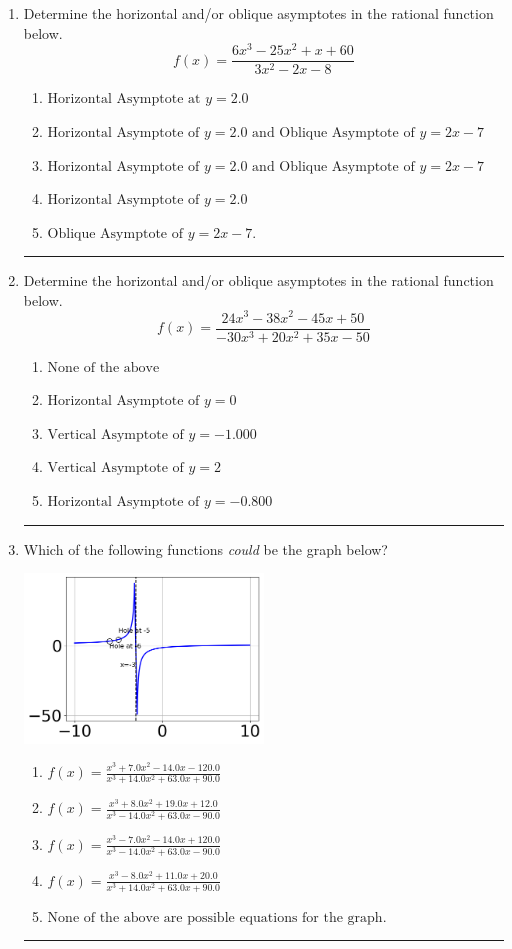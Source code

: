 \documentclass[14pt]{extbook}
\newcommand{\litem}[1]{\item#1\hspace*{-1cm}\rule{\textwidth}{0.4pt}}
\begin{document}
\begin{enumerate}
{\begin{enumerate}[label=\Alph*.]
\end{enumerate} }
\litem{
Determine the horizontal and/or oblique asymptotes in the rational function below.\[ f(x) = \frac{6x^{3} -25 x^{2} +x + 60}{3x^{2} -2 x -8} \]\begin{enumerate}[label=\Alph*.]
\item \( \text{Horizontal Asymptote at } y = 2.0 \)
\item \( \text{Horizontal Asymptote of } y = 2.0 \text{ and Oblique Asymptote of } y = 2x -7 \)
\item \( \text{Horizontal Asymptote of } y = 2.0 \text{ and Oblique Asymptote of } y = 2x -7 \)
\item \( \text{Horizontal Asymptote of } y = 2.0  \)
\item \( \text{Oblique Asymptote of } y = 2x -7. \)

\end{enumerate} }
\litem{
Determine the horizontal and/or oblique asymptotes in the rational function below.\[ f(x) = \frac{24x^{3} -38 x^{2} -45 x + 50}{-30x^{3} +20 x^{2} +35 x -50} \]\begin{enumerate}[label=\Alph*.]
\item \( \text{None of the above} \)
\item \( \text{Horizontal Asymptote of } y = 0  \)
\item \( \text{Vertical Asymptote of } y = -1.000  \)
\item \( \text{Vertical Asymptote of } y = 2  \)
\item \( \text{Horizontal Asymptote of } y = -0.800  \)

\end{enumerate} }
\litem{
Which of the following functions \textit{could} be the graph below?
\begin{center}
    \includegraphics[width=0.5\textwidth]{../Figures/identifyGraphOfRationalFunctionCopyC.png}
\end{center}
\begin{enumerate}[label=\Alph*.]
\item \( f(x)=\frac{x^{3} +7.0 x^{2} -14.0 x -120.0}{x^{3} +14.0 x^{2} +63.0 x + 90.0} \)
\item \( f(x)=\frac{x^{3} +8.0 x^{2} +19.0 x + 12.0}{x^{3} -14.0 x^{2} +63.0 x -90.0} \)
\item \( f(x)=\frac{x^{3} -7.0 x^{2} -14.0 x + 120.0}{x^{3} -14.0 x^{2} +63.0 x -90.0} \)
\item \( f(x)=\frac{x^{3} -8.0 x^{2} +11.0 x + 20.0}{x^{3} +14.0 x^{2} +63.0 x + 90.0} \)
\item \( \text{None of the above are possible equations for the graph.} \)


\end{enumerate}}
\end{enumerate}
\end{document}
